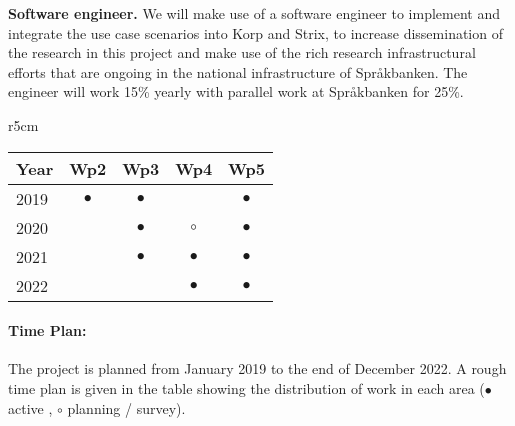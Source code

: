 \documentclass[12pt,twoside,a4paper]{article}
\begin{document}
	
	\textbf{Software engineer.} We will make use of a software engineer to implement and integrate the use case scenarios into Korp and Strix, to increase dissemination of the research in this project and make use of the rich research infrastructural efforts that are ongoing in the national infrastructure of Språkbanken. The engineer will work 15\% yearly with parallel work at Språkbanken for 25\%. 
\vspace{-1.0cm}
\begin{wraptable}{r}{5cm}
\small
		\centering
		\renewcommand{\arraystretch}{0.8}%
		\begin{tabular}{@{}l@{}c@{}c@{}c@{}c@{}}
			\toprule
			Year & Wp2 & Wp3 & Wp4 & Wp5\\
			\midrule
			2019 &  $\bullet$ &$\bullet$ & $ $ & $\bullet$  \\
			2020  & & $\bullet$ & $\circ$ &$\bullet$ \\
			2021  & & $\bullet$ & $\bullet$ &$\bullet$ \\
            2022 & & & $\bullet$ & $\bullet$ \\
			\bottomrule
		\end{tabular}
\end{wraptable}	
\vspace{-1.3cm}
	\paragraph{Time Plan:} 	The project is planned from January 2019 to the end of December 2022. A rough time plan is given in the table showing the distribution of work in each area ($\bullet$ active , $\circ$ planning / survey).



\vspace{-0.35cm}
	
\end{document}
